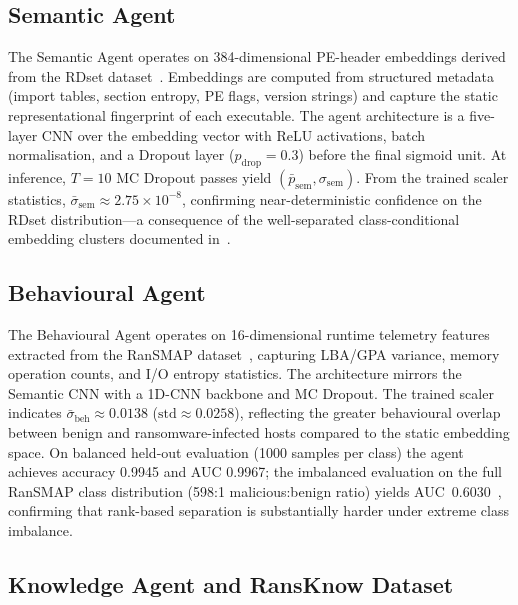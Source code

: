 \documentclass[journal]{IEEEtran}
\newcommand{\sem}{\mathrm{sem}}
\newcommand{\beh}{\mathrm{beh}}
\begin{document}
\subsection{Semantic Agent}

The Semantic Agent operates on 384-dimensional PE-header embeddings
derived from the RDset dataset~\cite{kabuye2025explainable}.
Embeddings are computed from structured metadata (import tables, section
entropy, PE flags, version strings) and capture the static representational
fingerprint of each executable.
The agent architecture is a five-layer CNN over the embedding vector
with ReLU activations, batch normalisation, and a Dropout layer
($p_{\mathrm{drop}}=0.3$) before the final sigmoid unit.
At inference, $T=10$ MC Dropout passes yield $(\bar{p}_\sem, \sigma_\sem)$.
From the trained scaler statistics, $\bar{\sigma}_\sem \approx 2.75
\times 10^{-8}$, confirming near-deterministic confidence on the
RDset distribution---a consequence of the well-separated class-conditional
embedding clusters documented in~\cite{kabuye2026sabre}.

\subsection{Behavioural Agent}

The Behavioural Agent operates on 16-dimensional runtime telemetry
features extracted from the RanSMAP dataset~\cite{kabuye2026sabre},
capturing LBA/GPA variance, memory operation counts, and I/O entropy
statistics.
The architecture mirrors the Semantic CNN with a 1D-CNN backbone and
MC Dropout.
The trained scaler indicates $\bar{\sigma}_\beh \approx 0.0138$
($\mathrm{std}\approx 0.0258$), reflecting the greater behavioural
overlap between benign and ransomware-infected hosts compared to the
static embedding space.
On balanced held-out evaluation (1000 samples per class) the agent
achieves accuracy 0.9945 and AUC 0.9967; the imbalanced evaluation
on the full RanSMAP class distribution (598:1 malicious:benign ratio)
yields AUC~0.6030~\cite{kabuye2026sabre}, confirming that rank-based
separation is substantially harder under extreme class imbalance.

\subsection{Knowledge Agent and RansKnow Dataset}
\label{subsec:knowledge_agent}
\end{document}
